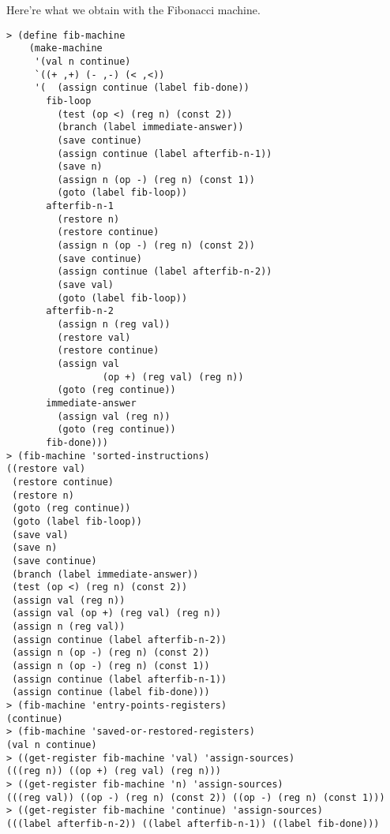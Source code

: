 \documentclass[a4paper,12pt]{article}
\begin{document}
Here're what we obtain with the Fibonacci machine.
\begin{lstlisting}
> (define fib-machine
    (make-machine
     '(val n continue)
     `((+ ,+) (- ,-) (< ,<))
     '(  (assign continue (label fib-done))
       fib-loop
         (test (op <) (reg n) (const 2))
         (branch (label immediate-answer))
         (save continue)
         (assign continue (label afterfib-n-1))
         (save n)
         (assign n (op -) (reg n) (const 1))
         (goto (label fib-loop))
       afterfib-n-1
         (restore n)
         (restore continue)
         (assign n (op -) (reg n) (const 2))
         (save continue)
         (assign continue (label afterfib-n-2))
         (save val)
         (goto (label fib-loop))
       afterfib-n-2
         (assign n (reg val))
         (restore val)
         (restore continue)
         (assign val
                 (op +) (reg val) (reg n))
         (goto (reg continue))
       immediate-answer
         (assign val (reg n))
         (goto (reg continue))
       fib-done)))
> (fib-machine 'sorted-instructions)
((restore val)
 (restore continue)
 (restore n)
 (goto (reg continue))
 (goto (label fib-loop))
 (save val)
 (save n)
 (save continue)
 (branch (label immediate-answer))
 (test (op <) (reg n) (const 2))
 (assign val (reg n))
 (assign val (op +) (reg val) (reg n))
 (assign n (reg val))
 (assign continue (label afterfib-n-2))
 (assign n (op -) (reg n) (const 2))
 (assign n (op -) (reg n) (const 1))
 (assign continue (label afterfib-n-1))
 (assign continue (label fib-done)))
> (fib-machine 'entry-points-registers)
(continue)
> (fib-machine 'saved-or-restored-registers)
(val n continue)
> ((get-register fib-machine 'val) 'assign-sources)
(((reg n)) ((op +) (reg val) (reg n)))
> ((get-register fib-machine 'n) 'assign-sources)
(((reg val)) ((op -) (reg n) (const 2)) ((op -) (reg n) (const 1)))
> ((get-register fib-machine 'continue) 'assign-sources)
(((label afterfib-n-2)) ((label afterfib-n-1)) ((label fib-done)))
\end{lstlisting}
\end{document}
